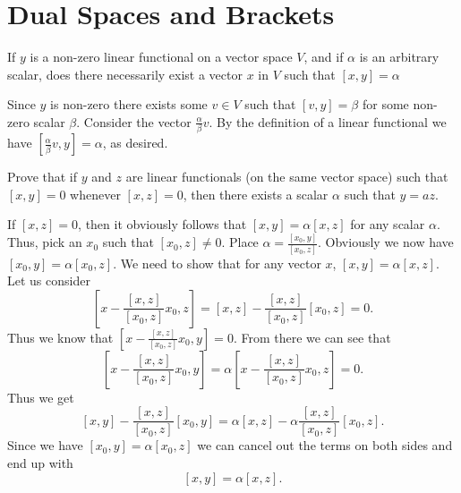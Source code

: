 \section{Dual Spaces and Brackets}

\setcounter{problem}{4} 
\begin{problem}
  If $y$ is a non-zero linear functional on a vector space $V$, and if $\alpha$ is an arbitrary scalar, does there necessarily exist a vector $x$ in $V$ such that $[x, y] = \alpha$
\end{problem}

\begin{solution}
  Since $y$ is non-zero there exists some $v \in V$ such that $[v, y] = \beta$ for some non-zero scalar $\beta$.
  Consider the vector $\frac{\alpha}{\beta} v$.
  By the definition of a linear functional we have $[\frac{\alpha}{\beta} v, y] = \alpha$, as desired.
\end{solution}

\begin{problem}
  Prove that if $y$ and $z$ are linear functionals (on the same vector space) such that $[x, y] = 0$ whenever $[x, z] = 0$, then there exists a scalar $\alpha$ such that $y = az$.
\end{problem}

\begin{solution}
  If $[x, z] = 0$, then it obviously follows that $[x, y] = \alpha [x, z]$ for any scalar $\alpha$.
  Thus, pick an $x_0$ such that $[x_0, z] \neq 0$.
  Place $\alpha = \frac{[x_0, y]}{[x_0, z]}$.
  Obviously we now have $[x_0, y] = \alpha [x_0, z]$.
  We need to show that for any vector $x$, $[x, y] = \alpha [x, z]$.
  Let us consider
  \[[x - \frac{[x, z]}{[x_0, z]} x_0, z] = [x, z] - \frac{[x, z]}{[x_0, z]} [x_0, z] = 0.\]
  Thus we know that $[x - \frac{[x, z]}{[x_0, z]} x_0, y] = 0$.
  From there we can see that
  \[[x - \frac{[x, z]}{[x_0, z]} x_0, y] = \alpha [x - \frac{[x, z]}{[x_0, z]} x_0, z] = 0.\]
  Thus we get
  \[[x, y] - \frac{[x, z]}{[x_0, z]} [x_0, y] = \alpha [x, z] - \alpha \frac{[x, z]}{[x_0, z]} [x_0, z].\]
  Since we have $[x_0, y] = \alpha [x_0, z]$ we can cancel out the terms on both sides and end up with
  \[[x, y] = \alpha [x, z].\]
\end{solution}



